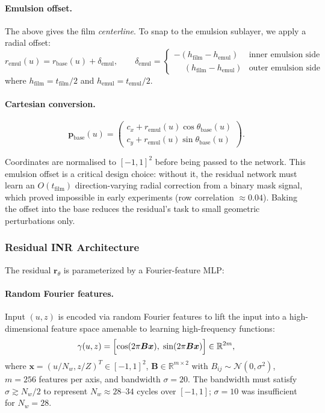 \documentclass[11pt,a4paper]{article}
\newcommand{\R}{\mathbb{R}}
\begin{document}
\paragraph{Emulsion offset.} The above gives the film \emph{centerline}. To snap to the emulsion sublayer, we apply a radial offset:
\begin{equation}
    r_{\text{emul}}(u) = r_{\text{base}}(u) + \delta_{\text{emul}},
    \qquad
    \delta_{\text{emul}} = \begin{cases}
        -(h_{\text{film}} - h_{\text{emul}}) & \text{inner emulsion side} \\
        \phantom{-}(h_{\text{film}} - h_{\text{emul}}) & \text{outer emulsion side}
    \end{cases}
\end{equation}
where $h_{\text{film}} = t_{\text{film}}/2$ and $h_{\text{emul}} = t_{\text{emul}}/2$.

\paragraph{Cartesian conversion.}
\begin{equation}
    \bm{p}_{\text{base}}(u) = \begin{pmatrix} c_x + r_{\text{emul}}(u)\cos\theta_{\text{base}}(u) \\ c_y + r_{\text{emul}}(u)\sin\theta_{\text{base}}(u) \end{pmatrix}.
    \label{eq:pbase}
\end{equation}

Coordinates are normalised to $[-1,1]^2$ before being passed to the network. This emulsion offset is a critical design choice: without it, the residual network must learn an $O(t_{\text{film}})$ direction-varying radial correction from a binary mask signal, which proved impossible in early experiments (row correlation $\approx 0.04$). Baking the offset into the base reduces the residual's task to small geometric perturbations only.

\subsubsection{Residual INR Architecture}

The residual $\bm{r}_\theta$ is parameterized by a Fourier-feature MLP:

\paragraph{Random Fourier features.} Input $(u, z)$ is encoded via random Fourier features \cite{rahimi2007random} to lift the input into a high-dimensional feature space amenable to learning high-frequency functions:
\begin{equation}
    \gamma(u, z) = \Bigl[\cos(2\pi\bm{B}\bm{x}),\; \sin(2\pi\bm{B}\bm{x})\Bigr] \in \R^{2m},
\end{equation}
where $\bm{x} = (u/N_w, z/Z)^T \in [-1,1]^2$, $\bm{B} \in \R^{m \times 2}$ with $B_{ij} \sim \mathcal{N}(0, \sigma^2)$, $m = 256$ features per axis, and bandwidth $\sigma = 20$. The bandwidth must satisfy $\sigma \gtrsim N_w / 2$ to represent $N_w \approx 28$--$34$ cycles over $[-1,1]$; $\sigma = 10$ was insufficient for $N_w = 28$.
\end{document}
